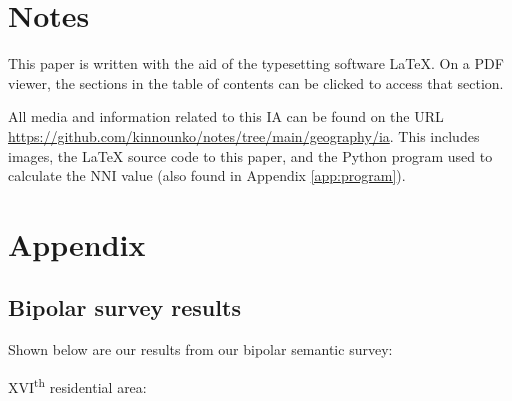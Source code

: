 \documentclass[11pt,letterpaper]{article}
\begin{document}
\newpage
{}


\section*{Notes}
\label{sec:notes}

This paper is written with the aid of the typesetting software \LaTeX. On a PDF viewer, the sections in the table of contents can be clicked to access that section.

All media and information related to this IA can be found on the URL \url{https://github.com/kinnounko/notes/tree/main/geography/ia}. This includes images, the \LaTeX{} source code to this paper, and the Python program used to calculate the NNI value (also found in Appendix \ref{app:program}).

\printbibliography

\appendix
\section{Appendix}
\label{app}

\subsection{Bipolar survey results}
\label{app:bipolar}

Shown below are our results from our bipolar semantic survey:

XVI\textsuperscript{th} residential area:
\end{document}
